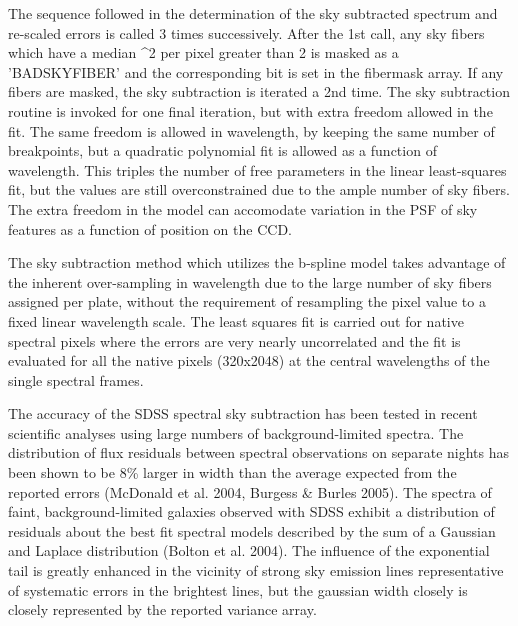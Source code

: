 The sequence followed in the determination of the sky subtracted spectrum
and re-scaled errors is called 3 times successively.  After the 1st call,
any sky fibers which have a median \chi^2 per pixel greater than 2 is 
masked as a 'BADSKYFIBER' and the corresponding bit is set in the fibermask
array.  If any fibers are masked, the sky subtraction is iterated a 2nd time.
The sky subtraction routine is invoked for one final iteration, but with extra 
freedom allowed in the fit.  The same freedom is allowed in wavelength, by
keeping the same number of breakpoints, but a quadratic polynomial fit is
allowed as a function of wavelength.  This triples the number of free 
parameters in the linear least-squares fit, but the values are still 
overconstrained due to the ample number of sky fibers.  The extra freedom
in the model can accomodate variation in the PSF of sky features as a function 
of position on the CCD.

The sky subtraction method which utilizes the b-spline model takes advantage 
of the inherent over-sampling in wavelength due to the large number of 
sky fibers assigned per plate, without the requirement of resampling the 
pixel value to a fixed linear wavelength scale.  The least squares fit
is carried out for native spectral pixels where the errors are very nearly 
uncorrelated and the fit is evaluated for all the native pixels (320x2048)  
at the central wavelengths of the single spectral frames.
    
The accuracy of the SDSS spectral sky subtraction has been tested in recent
scientific analyses using large numbers of background-limited spectra.   
The distribution of flux residuals between spectral observations 
on separate nights has been shown to be 8\% larger in width than the average expected
from the reported errors (McDonald et al. 2004, Burgess \& Burles 2005).
The spectra of faint, background-limited galaxies observed with SDSS exhibit a 
distribution of residuals about the best fit spectral models described by the sum of a
Gaussian and Laplace distribution (Bolton et al. 2004).  
The influence of the exponential tail is greatly enhanced in the vicinity of strong sky 
emission lines representative of systematic errors in the brightest lines, but the gaussian 
width closely is closely represented by the reported variance array.

